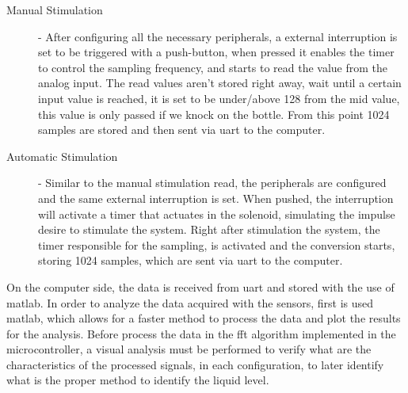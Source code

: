 \begin{description}
    \item[Manual Stimulation]{- After configuring all the necessary peripherals, a external interruption is set to be triggered with a push-button, when pressed it enables the timer to control the sampling frequency, and starts to read the value from the analog input. The read values aren't stored right away, wait until a certain input value is reached, it is set to be under/above 128 from the mid value, this value is only passed if we knock on the bottle. From this point 1024 samples are stored and then sent via \acrshort{uart} to the computer.}
      
    \item[Automatic Stimulation]{- Similar to the manual stimulation read, the peripherals are configured and the same external interruption is set. When pushed, the interruption will activate a timer that actuates in the solenoid, simulating the impulse desire to stimulate the system. Right after stimulation the system, the timer responsible for the sampling, is activated and the conversion starts, storing 1024 samples, which are sent via \acrshort{uart} to the computer.} 

\end{description}
On the computer side, the data is received from \acrshort{uart} and stored with the use of \acrshort{matlab}. In order to analyze the data acquired with the sensors, first is used \acrshort{matlab}, which allows for a faster method to process the data and plot the results for the analysis. Before process the data in the \acrshort{fft} algorithm implemented in the microcontroller, a visual analysis must be performed to verify what are the characteristics of the processed signals, in each configuration, to later identify what is the proper method to identify the liquid level.  
